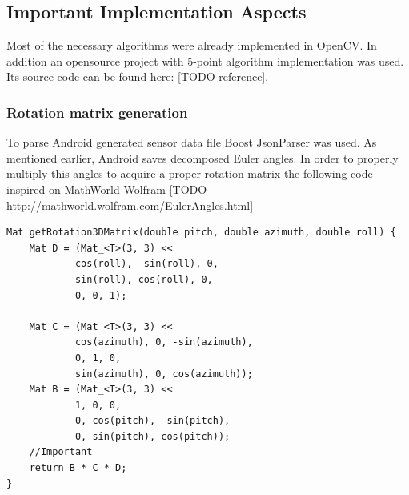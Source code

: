 \subsection{Important Implementation Aspects}
Most of the necessary algorithms were already implemented in OpenCV. In addition an opensource project with 5-point algorithm implementation was used. Its source code can be found here: [TODO reference].
\subsubsection{Rotation matrix generation}
To parse Android generated sensor data file Boost JsonParser was used. As mentioned earlier, Android saves decomposed Euler angles. In order to properly multiply this angles to acquire a proper rotation matrix the following code inspired on MathWorld Wolfram [TODO \url{http://mathworld.wolfram.com/EulerAngles.html}]
\begin{lstlisting}
Mat getRotation3DMatrix(double pitch, double azimuth, double roll) {
    Mat D = (Mat_<T>(3, 3) <<
            cos(roll), -sin(roll), 0,
            sin(roll), cos(roll), 0,
            0, 0, 1);

    Mat C = (Mat_<T>(3, 3) <<
            cos(azimuth), 0, -sin(azimuth),
            0, 1, 0,
            sin(azimuth), 0, cos(azimuth));
    Mat B = (Mat_<T>(3, 3) <<
            1, 0, 0,
            0, cos(pitch), -sin(pitch),
            0, sin(pitch), cos(pitch));
    //Important
    return B * C * D;
}
\end{lstlisting}
